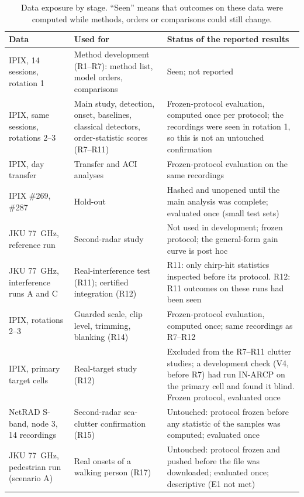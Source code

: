 \documentclass[10pt]{article}
\begin{document}
\begin{table}[h]
\centering\small
\caption{Data exposure by stage. ``Seen'' means that outcomes on these data were computed while methods, orders or comparisons could still change.}
\label{tab:exposure}
\begin{tabular}{p{4.3cm}p{5.2cm}p{6.2cm}}
\toprule
Data & Used for & Status of the reported results\\
\midrule
IPIX, 14 sessions, rotation 1 & Method development (R1--R7): method list, model orders, comparisons & Seen; not reported\\
IPIX, same sessions, rotations 2--3 & Main study, detection, onset, baselines, classical detectors, order-statistic scores (R7--R11) & Frozen-protocol evaluation, computed once per protocol; the recordings were seen in rotation 1, so this is not an untouched confirmation\\
IPIX, day transfer & Transfer and ACI analyses & Frozen-protocol evaluation on the same recordings\\
IPIX \#269, \#287 & Hold-out & Hashed and unopened until the main analysis was complete; evaluated once (small test sets)\\
JKU 77~GHz, reference run & Second-radar study & Not used in development; frozen protocol; the general-form gain curve is post hoc\\
JKU 77~GHz, interference runs A and C & Real-interference test (R11); certified integration (R12) & R11: only chirp-hit statistics inspected before its protocol. R12: R11 outcomes on these runs had been seen\\
IPIX, rotations 2--3 & Guarded scale, clip level, trimming, blanking (R14) & Frozen-protocol evaluation, computed once; same recordings as R7--R12\\
IPIX, primary target cells & Real-target study (R12) & Excluded from the R7--R11 clutter studies; a development check (V4, before R7) had run IN-ARCP on the primary cell and found it blind. Frozen protocol, evaluated once\\
NetRAD S-band, node 3, 14 recordings & Second-radar sea-clutter confirmation (R15) & Untouched: protocol frozen before any statistic of the samples was computed; evaluated once\\
JKU 77~GHz, pedestrian run (scenario A) & Real onsets of a walking person (R17) & Untouched: protocol frozen and pushed before the file was downloaded; evaluated once; descriptive (E1 not met)\\
\bottomrule
\end{tabular}
\end{table}
\end{document}
